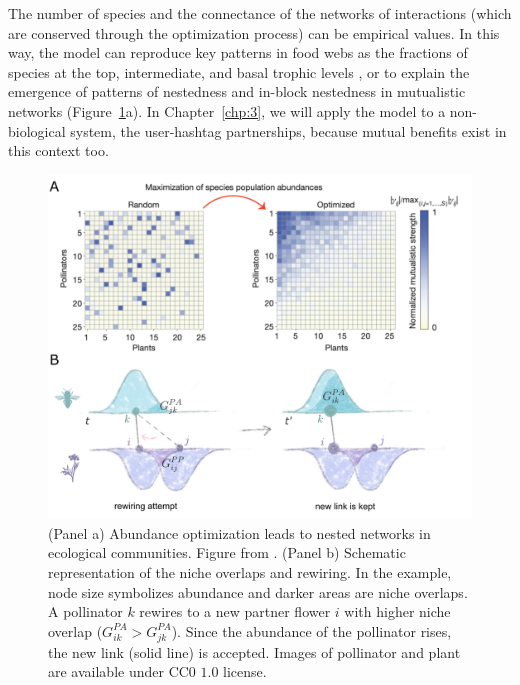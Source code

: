 The number of species and the connectance of the networks of interactions (which are conserved through the optimization process) can be empirical values. In this way, the model can reproduce key patterns in food webs as the fractions of species at the top, intermediate, and basal
trophic levels \cite{williams2000niche}, or to explain the emergence of patterns of nestedness and in-block nestedness \cite{suweis2013emergence,cai2021niches} in mutualistic networks (Figure~\ref{fig:nicheModel}a). In Chapter~\ref{chp:3}, we will apply the model to a non-biological system, the user-hashtag partnerships, because mutual benefits exist in this context too.
 \begin{figure}[t]
 \centering
   \includegraphics[width=\columnwidth]{figures/methods/niche.pdf}
    \caption[ Schematic representation of the niche model]{(Panel a) Abundance optimization leads to nested networks in ecological communities. Figure from \cite{suweis2013emergence}. (Panel b) Schematic representation of the niche overlaps and rewiring. In the example, node size symbolizes abundance and darker areas are niche overlaps. A pollinator $k$ rewires to a new partner flower $i$ with higher niche overlap ($G^{PA}_{ik} > G^{PA}_{jk}$). Since the abundance of the pollinator rises, the new link (solid line) is accepted. Images of pollinator and plant are available under CC0 $1.0$  license.}
   \label{fig:nicheModel}
\end{figure}
